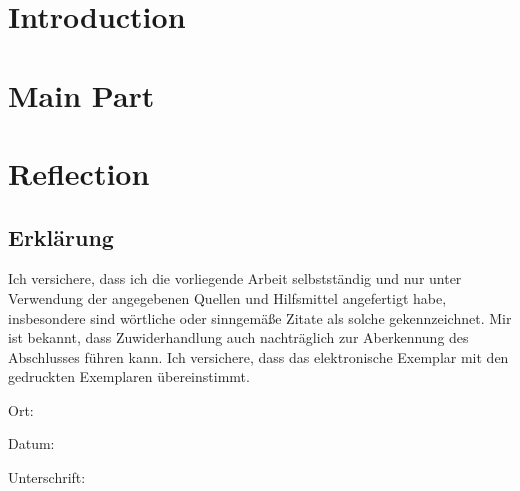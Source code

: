 \documentclass[headings=standardclasses]{scrbook}
\theoremstyle{remark}
\begin{document}
\part{Introduction}



\part{Main Part}




\part{Reflection}




\printbibliography

\begin{appendices}
    
\end{appendices}

\newpage

\chapter*{Erklärung}

Ich versichere, dass ich die vorliegende Arbeit selbstständig und nur unter Verwendung der angegebenen Quellen und Hilfsmittel angefertigt habe, insbesondere sind wörtliche oder sinngemäße Zitate als solche gekennzeichnet.
Mir ist bekannt, dass Zuwiderhandlung auch nachträglich zur Aberkennung des Abschlusses führen kann.
Ich versichere, dass das elektronische Exemplar mit den gedruckten Exemplaren übereinstimmt.

\begin{multicols}{3}
    Ort: \par
    \columnbreak
    Datum: \par
    \columnbreak
    Unterschrift: \par
\end{multicols}
\end{document}
